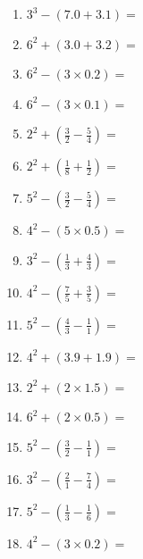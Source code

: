 \documentclass[12pt]{article}
\begin{document}
    \begin{enumerate}
\item \large $ 3^{3} - (7.0 + 3.1) = $ \vspace{1.4cm}
\item \large $ 6^{2} + (3.0 + 3.2) = $ \vspace{1.4cm}
\item \large $ 6^{2} - (3 \times 0.2) = $ \vspace{1.4cm}
\item \large $ 6^{2} - (3 \times 0.1) = $ \vspace{1.4cm}
\item \large $ 2^{2} + (\frac{3}{2} - \frac{5}{4}) = $ \vspace{1.4cm}
\item \large $ 2^{2} + (\frac{1}{8} + \frac{1}{2}) = $ \vspace{1.4cm}
\item \large $ 5^{2} - (\frac{3}{2} - \frac{5}{4}) = $ \vspace{1.4cm}
\item \large $ 4^{2} - (5 \times 0.5) = $ \vspace{1.4cm}
\newpage
\item \large $ 3^{2} - (\frac{1}{3} + \frac{4}{3}) = $ \vspace{1.4cm}
\item \large $ 4^{2} - (\frac{7}{5} + \frac{3}{5}) = $ \vspace{1.4cm}
\item \large $ 5^{2} - (\frac{4}{3} - \frac{1}{1}) = $ \vspace{1.4cm}
\item \large $ 4^{2} + (3.9 + 1.9) = $ \vspace{1.4cm}
\item \large $ 2^{2} + (2 \times 1.5) = $ \vspace{1.4cm}
\item \large $ 6^{2} + (2 \times 0.5) = $ \vspace{1.4cm}
\item \large $ 5^{2} - (\frac{3}{2} - \frac{1}{1}) = $ \vspace{1.4cm}
\item \large $ 3^{2} - (\frac{2}{1} - \frac{7}{4}) = $ \vspace{1.4cm}
\item \large $ 5^{2} - (\frac{1}{3} - \frac{1}{6}) = $ \vspace{1.4cm}
\item \large $ 4^{2} - (3 \times 0.2) = $ \vspace{1.4cm}

\end{enumerate}
\end{document}
